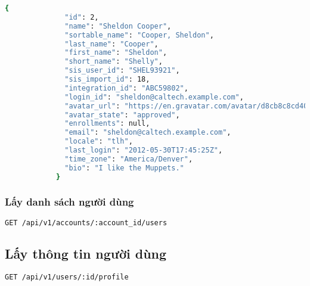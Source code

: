 \documentclass[../Thesis.tex]{subfiles}
\begin{document}
          \begin{lstlisting}[language=bash]
            {
              "id": 2,
              "name": "Sheldon Cooper",
              "sortable_name": "Cooper, Sheldon",
              "last_name": "Cooper",
              "first_name": "Sheldon",
              "short_name": "Shelly",
              "sis_user_id": "SHEL93921",
              "sis_import_id": 18,
              "integration_id": "ABC59802",
              "login_id": "sheldon@caltech.example.com",
              "avatar_url": "https://en.gravatar.com/avatar/d8cb8c8cd40ddf0cd05241443a591868?s=80&r=g",
              "avatar_state": "approved",
              "enrollments": null,
              "email": "sheldon@caltech.example.com",
              "locale": "tlh",
              "last_login": "2012-05-30T17:45:25Z",
              "time_zone": "America/Denver",
              "bio": "I like the Muppets."
            }
          \end{lstlisting}

          \subsubsection{Lấy danh sách người dùng}
          \begin{lstlisting}[language=bash]
            GET /api/v1/accounts/:account_id/users
          \end{lstlisting}
          
          \subsection{Lấy thông tin người dùng}
          \begin{lstlisting}[language=bash]
            GET /api/v1/users/:id/profile
          \end{lstlisting}



    
\end{document}
